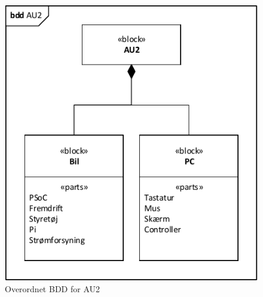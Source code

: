 \begin{figure}[h]
\centering
\includegraphics[scale=1]{../fig/diagrammer/bdd_au2.pdf}
\caption{Overordnet BDD for AU2}
\label{fig:bdd_au2}
\end{figure}

\clearpage
 \clearpage
 \clearpage
 \clearpage